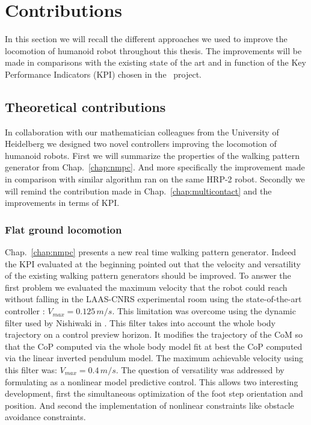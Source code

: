 \section*{Contributions}

In this section we will recall the different approaches we used to improve the locomotion of humanoid robot throughout this thesis.
The improvements will be made in comparisons with the existing state of the art and in function of the Key Performance Indicators (KPI) chosen in the \koroibot\ project.

\subsection*{Theoretical contributions}

In collaboration with our mathematician colleagues from the University of Heidelberg we designed two novel controllers improving the locomotion of humanoid robots.
First we will summarize the properties of the walking pattern generator from Chap.~\ref{chap:nmpc}.
And more specifically the improvement made in comparison with similar algorithm ran on the same HRP-2 robot.
Secondly we will remind the contribution made in Chap.~\ref{chap:multicontact} and the improvements in terms of KPI.

\subsubsection*{Flat ground locomotion}

Chap.~\ref{chap:nmpc} presents a new real time walking pattern generator.
Indeed the KPI evaluated at the beginning pointed out that the velocity and versatility of the existing walking pattern generators \cite{herdt:iros:2010} should be improved.
To answer the first problem we evaluated the maximum velocity that the robot could reach without falling in the LAAS-CNRS experimental room using the state-of-the-art controller \cite{herdt:iros:2010}: $V_{max} = 0.125\,m/s$.
This limitation was overcome using the dynamic filter used by Nishiwaki in \cite{Nishiwaki:IJRR:09}.
This filter takes into account the whole body trajectory on a control preview horizon.
It modifies the trajectory of the CoM so that the CoP computed via the whole body model fit at best the CoP computed via the linear inverted pendulum model.
The maximum achievable velocity using this filter was: $V_{max} = 0.4\,m/s$.
The question of versatility was addressed by formulating \cite{herdt:iros:2010} as a nonlinear model predictive control.
This allows two interesting development, first the simultaneous optimization of the foot step orientation and position.
And second the implementation of nonlinear constraints like obstacle avoidance constraints.

